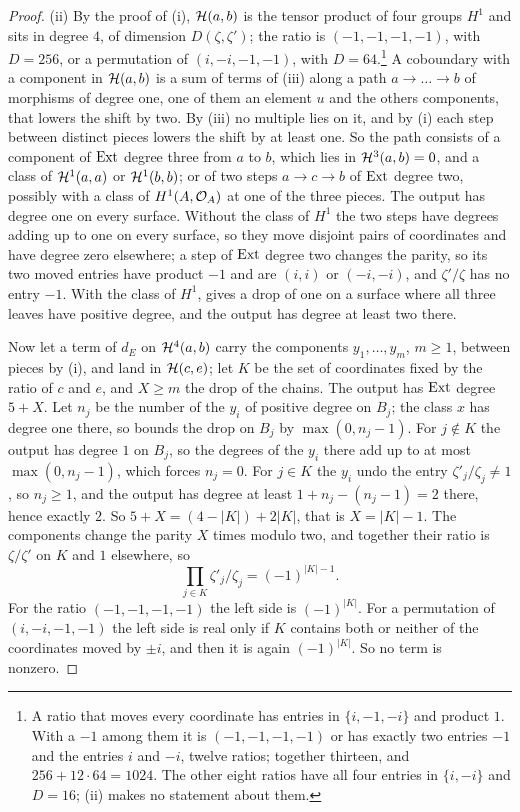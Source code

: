 \begin{proof}
(ii) By the proof of (i), $\mathcal{H}(a,b)$ is the tensor
product of four groups $H^{1}$ and sits in degree $4$, of dimension
$D(\zeta,\zeta')$; the ratio is $(-1,-1,-1,-1)$, with $D=256$, or a
permutation of $(i,-i,-1,-1)$, with $D=64$.\footnote{A ratio that moves
every coordinate has entries in $\{i,-1,-i\}$ and product $1$. With a $-1$
among them it is $(-1,-1,-1,-1)$ or has exactly two entries $-1$ and the
entries $i$ and $-i$, twelve ratios; together thirteen, and
$256+12\cdot64=1024$. The other eight ratios have all four entries in
$\{i,-i\}$ and $D=16$; (ii) makes no statement about them.} A coboundary with a component in $\mathcal{H}(a,b)$ is
a sum of terms of (iii) along a path
$a\to\dots\to b$ of morphisms of degree one, one of them an element $u$ and
the others components, that lowers the shift by two. By
(iii) no multiple lies on it, and by
(i) each step between distinct pieces lowers the shift
by at least one. So the path consists of a component of $\operatorname{Ext}$ degree three
from $a$ to $b$, which lies in $\mathcal{H}^{3}(a,b)=0$, and a class of
$\mathcal{H}^{1}(a,a)$ or $\mathcal{H}^{1}(b,b)$; or of two steps $a\to c\to b$ of $\operatorname{Ext}$
degree two, possibly with a class of $H^{1}(A,\mathcal{O}_{A})$ at one of the three
pieces. The output has degree one on every surface. Without the class of
$H^{1}$ the two steps have degrees adding up to one on every surface, so they
move disjoint pairs of coordinates and have degree zero elsewhere; a step of
$\operatorname{Ext}$ degree two changes the parity, so its two moved entries have product
$-1$ and are $(i,i)$ or $(-i,-i)$, and $\zeta'/\zeta$ has no entry $-1$.
With the class of $H^{1}$,  gives a drop of one on a
surface where all three leaves have positive degree, and the output has
degree at least two there.

Now let a term of $d_{E}$ on $\mathcal{H}^{4}(a,b)$ carry the components
$y_{1},\dots,y_{m}$, $m\ge1$, between pieces by (i), and land in
$\mathcal{H}(c,e)$; let $K$ be the set of coordinates fixed by the ratio of $c$ and
$e$, and $X\ge m$ the drop of the chains. The output has $\operatorname{Ext}$ degree
$5+X$. Let $n_{j}$ be the number of the $y_{i}$ of positive degree on
$B_{j}$; the class $x$ has degree one there, so  bounds
the drop on $B_{j}$ by $\max(0,n_{j}-1)$. For $j\notin K$ the output has
degree $1$ on $B_{j}$, so the degrees of the $y_{i}$ there add up to at most
$\max(0,n_{j}-1)$, which forces $n_{j}=0$. For $j\in K$ the $y_{i}$ undo the
entry $\zeta'_{j}/\zeta_{j}\ne1$, so $n_{j}\ge1$, and the output has degree
at least $1+n_{j}-(n_{j}-1)=2$ there, hence exactly $2$. So
$5+X=(4-|K|)+2|K|$, that is $X=|K|-1$. The components change the parity
$X$ times modulo two, and together their ratio is $\zeta/\zeta'$ on $K$ and
$1$ elsewhere, so
\[
  \prod_{j\in K}\zeta'_{j}/\zeta_{j}=(-1)^{|K|-1}.
\]
For the ratio $(-1,-1,-1,-1)$ the left side is $(-1)^{|K|}$. For a
permutation of $(i,-i,-1,-1)$ the left side is real only if $K$ contains
both or neither of the coordinates moved by $\pm i$, and then it is again
$(-1)^{|K|}$. So no term is nonzero.


\end{proof}
